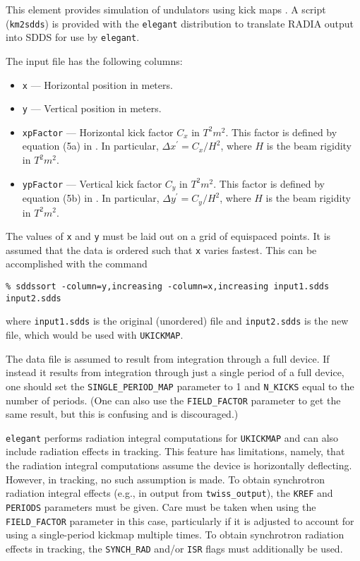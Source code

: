 This element provides simulation of undulators using kick maps \cite{Elleaume1992}.
A script (\verb|km2sdds|) is provided with the {\tt elegant}
distribution to translate RADIA \cite{radia} output into SDDS for use by
\verb|elegant|.

The input file has the following columns:
\begin{itemize}
\item \verb|x| --- Horizontal position in meters.
\item \verb|y| --- Vertical position in meters.
\item \verb|xpFactor| --- Horizontal kick factor $C_x$ in $T^2 m^2$.  This factor is defined by
equation (5a) in \cite{Elleaume1992}.  In particular, $\Delta x^\prime = C_x/H^2$, where
$H$ is the beam rigidity in  $T^2 m^2$.
\item \verb|ypFactor| --- Vertical kick factor $C_y$ in $T^2 m^2$. This factor is defined by
equation (5b) in \cite{Elleaume1992}.  In particular, $\Delta y^\prime = C_y/H^2$, where
$H$ is the beam rigidity in  $T^2 m^2$.
\end{itemize}
The values of \verb|x| and \verb|y| must be laid out on a grid of equispaced points.
It is assumed that the data is ordered such that \verb|x| varies fastest.  This can be
accomplished with the command
\begin{verbatim}
% sddssort -column=y,increasing -column=x,increasing input1.sdds input2.sdds
\end{verbatim}
where \verb|input1.sdds| is the original (unordered) file and \verb|input2.sdds| is the
new file, which would be used with \verb|UKICKMAP|.

The data file is assumed to result from integration through a full device. 
If instead it results from integration through just a single period of a full device, one
should set the \verb|SINGLE_PERIOD_MAP| parameter to 1 and \verb|N_KICKS| equal to the
number of periods.  (One can also use the \verb|FIELD_FACTOR| parameter to get the same
result, but this is confusing and is discouraged.)

{\tt elegant} performs radiation integral computations
for \verb|UKICKMAP| and can also include radiation effects in
tracking.  This feature has limitations, namely, that the radiation
integral computations assume the device is horizontally deflecting.
However, in tracking, no such assumption is made.  
To obtain synchrotron radiation integral effects (e.g., in output from \verb|twiss_output|), 
the \verb|KREF| and \verb|PERIODS| parameters must be given.
Care must be taken when using the \verb|FIELD_FACTOR| parameter in this case, particularly if
it is adjusted to account for using a single-period kickmap multiple times.
To obtain synchrotron radiation effects in tracking, the \verb|SYNCH_RAD| and/or \verb|ISR| flags
must additionally be used.

